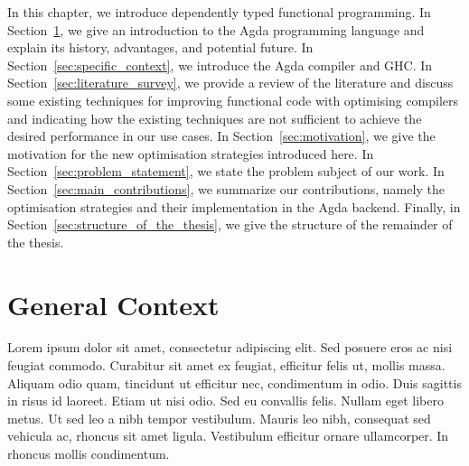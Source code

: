 In this chapter, we introduce dependently typed functional programming. In Section~\ref{sec:general_context}, we give an introduction to the Agda programming language and explain its history, advantages, and potential future. In Section~\ref{sec:specific_context}, we introduce the Agda compiler and GHC. In Section~\ref{sec:literature_survey}, we provide a review of the literature and discuss some existing techniques for improving functional code with optimising compilers and indicating how the existing techniques are not sufficient to achieve the desired performance in our use cases. In Section~\ref{sec:motivation}, we give the motivation for the new optimisation strategies introduced here. In Section~\ref{sec:problem_statement}, we state the problem subject of our work. In Section~\ref{sec:main_contributions}, we summarize our contributions, namely the optimisation strategies and their implementation in the Agda backend. Finally, in Section~\ref{sec:structure_of_the_thesis}, we give the structure of the remainder of the thesis.

\section{General Context}
\label{sec:general_context}

Lorem ipsum dolor sit amet, consectetur adipiscing elit. Sed posuere eros ac nisi feugiat commodo. Curabitur sit amet ex feugiat, efficitur felis ut, mollis massa. Aliquam odio quam, tincidunt ut efficitur nec, condimentum in odio. Duis sagittis in risus id laoreet. Etiam ut nisi odio. Sed eu convallis felis. Nullam eget libero metus. Ut sed leo a nibh tempor vestibulum. Mauris leo nibh, consequat sed vehicula ac, rhoncus sit amet ligula. Vestibulum efficitur ornare ullamcorper. In rhoncus mollis condimentum. \newline

